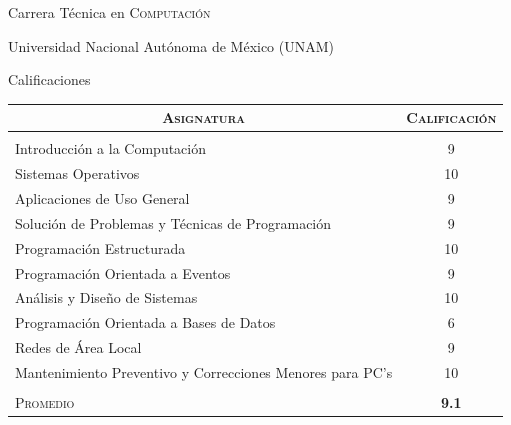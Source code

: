 \documentclass[a4paper,10pt]{article} %
\begin{document}
\par{\centering\LARGE \hypertarget{grdstechcarr}{Carrera Técnica en \textsc{Computación}}\par}\par{\centering\Large Universidad Nacional Autónoma de México (UNAM)\par}\large{\centering Calificaciones\par}\small
\bigskip
\bigskip
\bigskip
\begin{center}
	\begin{tabular}{lc}
		\multicolumn{1}{c}{\textsc{Asignatura}} & \textsc{Calificación}\\ \hline \\
		Introducción a la Computación & 9 \\ 
		Sistemas Operativos & 10 \\
		Aplicaciones de Uso General & 9 \\
		Solución de Problemas y Técnicas de Programación & 9 \\
		Programación Estructurada & 10 \\
		Programación Orientada a Eventos & 9 \\
		Análisis y Diseño de Sistemas & 10 \\
		Programación Orientada a Bases de Datos & 6 \\
		Redes de Área Local & 9 \\
		Mantenimiento Preventivo y Correcciones Menores para PC's & 10 \\ \\

		\textsc{Promedio}&\textbf{9.1}
	\end{tabular}
\end{center}

\end{document}
